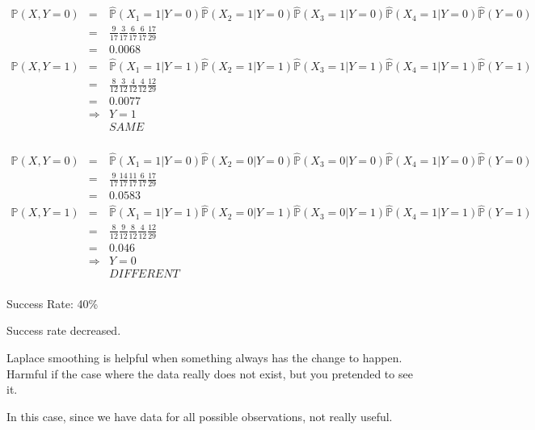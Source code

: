 \documentclass[12pt]{article}
\begin{document}
\begin{eqnarray*}
  \mathbb{P}(X, Y=0)
	&=& \hat{\mathbb{P}}(X_1=1|Y=0) \hat{\mathbb{P}}(X_2=1|Y=0)
	  \hat{\mathbb{P}}(X_3=1|Y=0) \hat{\mathbb{P}}(X_4=1|Y=0) \hat{\mathbb{P}}(Y=0)\\
	&=& \frac{9}{17} \frac{3}{17} \frac{6}{17} \frac{6}{17} \frac{17}{29} \\
	&=& 0.0068 \\ 
  \mathbb{P}(X, Y=1)
	&=& \hat{\mathbb{P}}(X_1=1|Y=1) \hat{\mathbb{P}}(X_2=1|Y=1)
	  \hat{\mathbb{P}}(X_3=1|Y=1) \hat{\mathbb{P}}(X_4=1|Y=1) \hat{\mathbb{P}}(Y=1)\\
	&=& \frac{8}{12} \frac{3}{12} \frac{4}{12} \frac{4}{12} \frac{12}{29} \\
	&=& 0.0077 \\
	&\Rightarrow& Y=1\\ 
	&& SAME \\
\end{eqnarray*}

\begin{eqnarray*}
  \mathbb{P}(X, Y=0)
	&=& \hat{\mathbb{P}}(X_1=1|Y=0) \hat{\mathbb{P}}(X_2=0|Y=0)
	  \hat{\mathbb{P}}(X_3=0|Y=0) \hat{\mathbb{P}}(X_4=1|Y=0) \hat{\mathbb{P}}(Y=0)\\
	&=& \frac{9}{17} \frac{14}{17} \frac{11}{17} \frac{6}{17} \frac{17}{29} \\
	&=& 0.0583 \\ 
  \mathbb{P}(X, Y=1)
	&=& \hat{\mathbb{P}}(X_1=1|Y=1) \hat{\mathbb{P}}(X_2=0|Y=1)
	  \hat{\mathbb{P}}(X_3=0|Y=1) \hat{\mathbb{P}}(X_4=1|Y=1) \hat{\mathbb{P}}(Y=1)\\
	&=& \frac{8}{12} \frac{9}{12} \frac{8}{12} \frac{4}{12} \frac{12}{29} \\
	&=& 0.046 \\
	&\Rightarrow& Y=0\\ 
	&& DIFFERENT \\
\end{eqnarray*}

Success Rate: 40\%

Success rate decreased.

Laplace smoothing is helpful when something always has the change to happen.
Harmful if the case where the data really does not exist, but you pretended to see it.

In this case, since we have data for all possible observations, not really useful. 
\end{document}
